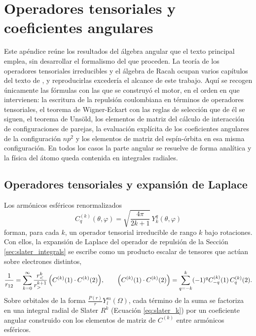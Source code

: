 \chapter{Operadores tensoriales y coeficientes angulares}
\label{ap:operadores-tensoriales}

Este apéndice reúne los resultados del álgebra angular que el texto principal emplea, sin desarrollar el formalismo del que proceden. La teoría de los operadores tensoriales irreducibles y el álgebra de Racah ocupan varios capítulos del texto de \textcite{Cowan1981}, y reproducirlas excedería el alcance de este trabajo. Aquí se recogen únicamente las fórmulas con las que se construyó el motor, en el orden en que intervienen: la escritura de la repulsión coulombiana en términos de operadores tensoriales, el teorema de Wigner-Eckart con las reglas de selección que de él se siguen, el teorema de Unsöld, los elementos de matriz del cálculo de interacción de configuraciones de parejas, la evaluación explícita de los coeficientes angulares de la configuración $np^2$ y los elementos de matriz del espín-órbita en esa misma configuración. En todos los casos la parte angular se resuelve de forma analítica y la física del átomo queda contenida en integrales radiales.

\section{Operadores tensoriales y expansión de Laplace}

Los armónicos esféricos renormalizados
\begin{equation}
  C_q^{(k)}(\theta, \varphi) = \sqrt{\frac{4\pi}{2k+1}}\, Y_k^q(\theta, \varphi)
\end{equation}
forman, para cada $k$, un operador tensorial irreducible de rango $k$ bajo rotaciones. Con ellos, la expansión de Laplace del operador de repulsión de la Sección \ref{sec:slater_integrals} se escribe como un producto escalar de tensores que actúan sobre electrones distintos,
\begin{equation}
  \frac{1}{r_{12}} = \sum_{k=0}^{\infty} \frac{r_{<}^k}{r_{>}^{k+1}}\, \qty( C^{(k)}(1) \cdot C^{(k)}(2) ), \qquad \qty( C^{(k)}(1) \cdot C^{(k)}(2) ) = \sum_{q=-k}^k (-1)^q C_{-q}^{(k)}(1)\, C_q^{(k)}(2).
\end{equation}
Sobre orbitales de la forma $\frac{P(r)}{r} Y_l^m(\Omega)$, cada término de la suma se factoriza en una integral radial de Slater $R^k$ (Ecuación \eqref{eq:slater_k}) por un coeficiente angular construido con los elementos de matriz de $C^{(k)}$ entre armónicos esféricos.

